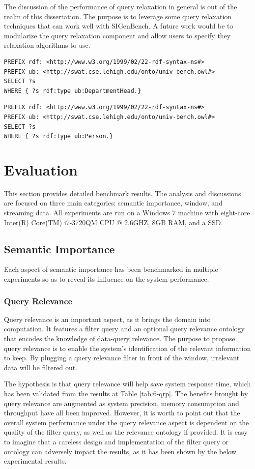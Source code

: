 The discussion of the performance of query relaxation in general is out of the realm of this dissertation. 
The purpose is to leverage some query relaxation techniques that can work well with SIGenBench. 
A future work would be to modularize the query relaxation component and allow users to specify they relaxation algorithms to use.

\begin{lstlisting}[language=SPARQL, caption={Relaxed Query 1},basicstyle=\small,frame=single]
PREFIX rdf: <http://www.w3.org/1999/02/22-rdf-syntax-ns#>
PREFIX ub: <http://swat.cse.lehigh.edu/onto/univ-bench.owl#>
SELECT ?s
WHERE {	?s rdf:type ub:DepartmentHead.}
\end{lstlisting}

\begin{lstlisting}[language=SPARQL, caption={Relaxed Query 2},basicstyle=\small,frame=single]
PREFIX rdf: <http://www.w3.org/1999/02/22-rdf-syntax-ns#>
PREFIX ub: <http://swat.cse.lehigh.edu/onto/univ-bench.owl#>
SELECT ?s
WHERE {	?s rdf:type ub:Person.}
\end{lstlisting}
%
\section{Evaluation}
This section provides detailed benchmark results.
The analysis and discussions are focused on three main categories: semantic importance, window, and streaming data.
All experiments are run on a Windows 7 machine with eight-core Inter(R) Core(TM) i7-3720QM CPU @ 2.6GHZ, 8GB RAM, and a SSD. 
%
\subsection{Semantic Importance}
Each aspect of semantic importance has been benchmarked in multiple experiments so as to reveal its influence on the system performance. 
%
\subsubsection{Query Relevance}
Query relevance is an important aspect, as it brings the domain into computation.
It features a filter query and an optional query relevance ontology that encodes the knowledge of data-query relevance.
The purpose to propose query relevance is to enable the system's identification of the relevant information to keep. 
By plugging a query relevance filter in front of the window, irrelevant data will be filtered out.

The hypothesis is that query relevance will help save system response time, which has been validated from the results at Table \ref{tab:6-qrp}. 
The benefits brought by query relevance are augmented as system precision, memory consumption and throughput have all been improved. 
However, it is worth to point out that the overall system performance under the query relevance aspect is dependent on the quality of the filter query, as well as the relevance ontology if provided. 
It is easy to imagine that a careless design and implementation of the filter query or ontology can adversely impact the results, as it has been shown by the below experimental results.

